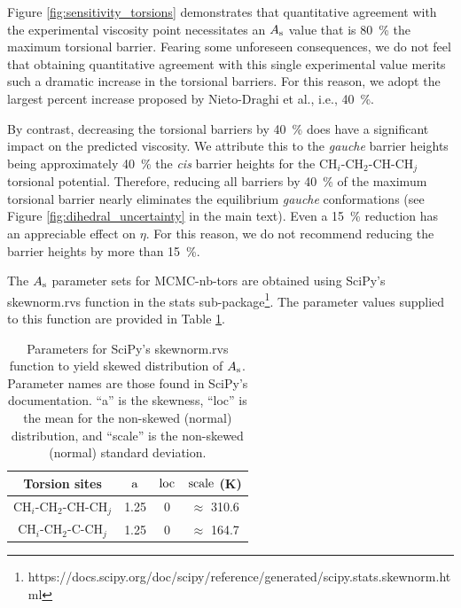 \documentclass[preprint,review,11pt]{elsarticle}
\begin{document}
	
	Figure \ref{fig:sensitivity_torsions} demonstrates that quantitative agreement with the experimental viscosity point necessitates an $A_{\rm s}$ value that is 80~\% the maximum torsional barrier. Fearing some unforeseen consequences, we do not feel that obtaining quantitative agreement with this single experimental value merits such a dramatic increase in the torsional barriers. For this reason, we adopt the largest percent increase proposed by Nieto-Draghi et al., i.e., 40~\%. 
	
	By contrast, decreasing the torsional barriers by 40~\% does have a significant impact on the predicted viscosity. We attribute this to the \textit{gauche} barrier heights being approximately 40~\% the \textit{cis} barrier heights for the CH$_i$-CH$_2$-CH-CH$_j$ torsional potential. Therefore, reducing all barriers by 40~\% of the maximum torsional barrier nearly eliminates the equilibrium \textit{gauche} conformations (see Figure \ref{fig:dihedral_uncertainty} in the main text). Even a 15~\% reduction has an appreciable effect on $\eta$. For this reason, we do not recommend reducing the barrier heights by more than 15~\%.	
	
	The $A_{\rm s}$ parameter sets for MCMC-nb-tors are obtained using SciPy's skewnorm.rvs function in the stats sub-package\footnote{https://docs.scipy.org/doc/scipy/reference/generated/scipy.stats.skewnorm.html}. The parameter values supplied to this function are provided in Table \ref{tab:distribution_parameters}.
	
	\begin{table}[htb!]
		\caption{Parameters for SciPy's skewnorm.rvs function to yield skewed distribution of $A_{\rm s}$. Parameter names are those found in SciPy's documentation. ``a'' is the skewness, ``loc'' is the mean for the non-skewed (normal) distribution, and ``scale'' is the non-skewed (normal) standard deviation.} \label{tab:distribution_parameters}
		\begin{center}
			\begin{tabular}{|c|c|c|c|}
				\hline
				Torsion sites & $\rm a$ & $\rm loc$ & $\rm scale$ (K) \\ \hline
				CH$_i$-CH$_2$-CH-CH$_j$ & 1.25 & 0 & $\approx$ 310.6 \\
				CH$_i$-CH$_2$-C-CH$_j$ & 1.25 & 0 & $\approx$ 164.7 \\
				\hline
			\end{tabular}
		\end{center} 
	\end{table} 
	
\end{document}
